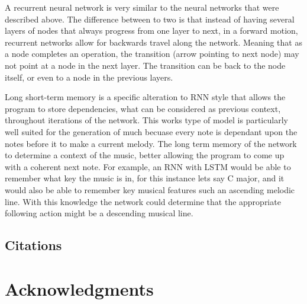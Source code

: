 \documentclass{sig-alternate}
\begin{document}
	 A recurrent neural network is very similar to the neural networks that were described above. The difference between to two is that instead of having several layers of nodes that always progress from one layer to next, in a forward motion, recurrent networks allow for backwards travel along the network. Meaning that as a node completes an operation, the transition (arrow pointing to next node) may not point at a node in the next layer. The transition can be back to the node itself, or even to a node in the previous layers.
	
	Long short-term memory is a specific alteration to RNN style that allows the program to store dependencies, what can be considered as previous context, throughout iterations of the network. This works type of model is particularly well suited for the generation of much becuase every note is dependant upon the notes before it to make a current melody. The long term memory of the network to determine a context of the music, better allowing the program to come up with a coherent next note. For example, an RNN with LSTM would be able to remember what key the music is in, for this instance lets say C major, and it would also be able to remember key musical features such an ascending melodic line. With this knowledge the network could determine that the appropriate following action might be a descending musical line. 

	
	

\label{sec:methodsandmusic}
\subsection{Citations}
\label{sec:citations}

\section*{Acknowledgments}
\label{sec:acknowledgments}









  
\end{document}
